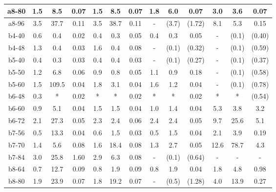 \documentclass[dissertation,draft*]{aaltoseries}
\begin{document}
\begin{table}
{\begin{center}
\begin{tabular}{|c|ccc|ccc|ccc|ccc|}
\hline
a8-80 & 1.5 & 8.5 & 0.07    & 1.5 & 8.5 & 0.07 & 1.8 & 6.0 &0.07& 3.0 & 3.6 &0.07\\ %
\hline
a8-96 & 3.5 & 37.7 & 0.11   & 3.5 & 38.7 & 0.11 &- & (3.7) & (1.72) & 8.1 & 5.3 &0.15\\ %
\hline
b4-40 & 0.6 & 0.4 & 0.02    & 0.4 & 0.3 & 0.05 & 0.4 & 0.3 &0.05& - &(0.1) & (0.40) \\ %
\hline
b4-48 & 1.3 & 0.4 & 0.03    & 1.6 & 0.4 & 0.08 & - & (0.1) & (0.32) & - & (0.1) & (0.59)\\ %
\hline
b5-40 & 0.4 & 0.3 & 0.03    & 0.4 & 0.4 & 0.03 & - & (0.1) & (0.27) & - &  (0.1) & (0.37)\\ %
\hline
b5-50 & 1.2 & 6.8 & 0.06    & 0.9 & 0.8 & 0.05 & 1.1 & 0.9 &0.18& - & (0.1) & (0.58) \\ %
\hline
b5-60 & 1.5 & 109.5 & 0.04  & 1.8 & 3.1 & 0.04 & 1.6 & 1.2 &0.04& - & (0.1) & (0.78) \\ %
\hline
b6-48 & 0.3 & * & 0.02    & * & * & 0.02 & * & * &0.02& * & * & (0.54) \\ %
\hline
b6-60 & 0.9 & 5.1 & 0.04    & 1.5 & 1.5 & 0.04 & 1.0 & 1.4 &0.04& 5.3 & 3.8 & 3.2 \\ %
\hline
b6-72 & 2.1 & 27.3 & 0.05   & 2.3 & 2.4 & 0.06 & 2.4 & 2.4 &0.05& 9.7 & 25.6 & 5.1 \\ %
\hline
b7-56 & 0.5 & 13.3 & 0.04   & 0.6 & 1.5 & 0.03 & 0.5 & 1.5 &0.04& 2.1 & 3.9 & 0.19\\ %
\hline
b7-70 & 1.4 & 5.6 & 0.08    & 1.6 & 18.4 & 0.08 & 1.3 & 2.7 &0.05& 12.6 & 78.7 & 4.3\\ %
\hline
b7-84 & 3.0 & 25.8 & 1.60      & 2.9 & 6.3 & 0.08 & - & (0.1) & (0.64) & - & - & - \\ %
\hline
b8-64 & 0.7 & 12.7 & 0.09   & 0.8 & 1.9 & 0.09 & 0.8 & 1.9 &0.04& 1.8 & 4.8 & 0.98 \\ %
\hline
b8-80 & 1.9 & 23.9 & 0.07   & 1.8 & 19.2 & 0.07 & - & (0.5) &(1.28)& 4.0 & 13.9 &0.27\\ %

\end{tabular}
\end{center}}
\end{table}
\end{document}
